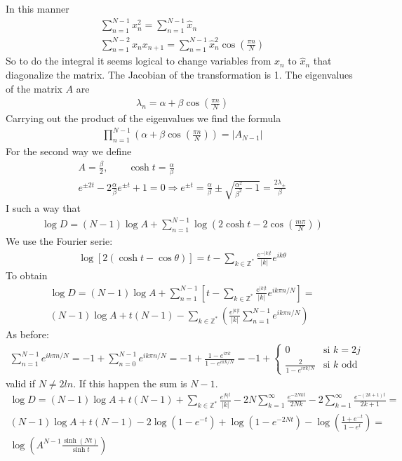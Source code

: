 \documentclass[12pt]{article}
\begin{document}
In this manner
\begin{gather}
\sum_{n=1}^{N-1}x_n^2=\sum_{n=1}^{N-1}\hat x_n \\
\sum_{n=1}^{N-2}x_n x_{n+1}=\sum_{n=1}^{N-1} \hat x_n^2 \cos\left(\frac{\pi n}{N}\right)
\end{gather}
So to do the integral it seems logical to change variables from $x_n$ to $\hat x_n$ that diagonalize the matrix. The Jacobian of the transformation is 1. The eigenvalues of the matrix $A$ are
\begin{gather}
\lambda_n=\alpha+\beta \cos\left(\frac{\pi n}{N}\right)
\end{gather}
Carrying out the product of the eigenvalues we find the formula
\begin{gather}
\prod_{n=1}^{N-1}\left(\alpha+\beta\cos\left(\frac{\pi n}{N}\right)\right)=|A_{N-1}|
\end{gather}
For the second way we define
\begin{gather}
A=\frac{\beta}{2},\qquad \cosh t=\frac{\alpha}{\beta} \\
e^{\pm 2t}-2\frac{\alpha}{\beta}e^{\pm t}+1=0\Rightarrow e^{\pm t}=\frac{\alpha}{\beta}\pm\sqrt{\frac{\alpha^2}{\beta^2}-1}=\frac{2\lambda_\pm}{\beta}
\end{gather}
I such a way that
\begin{gather}
\log D=(N-1)\log A+\sum_{n=1}^{N-1}\log\left(2\cosh t-2\cos\left(\frac{m \pi}{N}\right)\right)
\end{gather}
We use the Fourier serie:
\begin{gather}
\log\left[2(\cosh t-\cos \theta)\right]=t-\sum_{k\in\mathbb Z^*}\frac{e^{-|k|t}}{|k|}e^{ik\theta}
\end{gather}
To obtain
\begin{gather}
\log D=(N-1)\log A+\sum_{n=1}^{N-1}\left[t-\sum_{k\in\mathbb Z^*}\frac{e^{|k|t}}{|k|}e^{ik\pi n/N}\right]= \nonumber\\
(N-1)\log A+t(N-1)-\sum_{k\in\mathbb Z^*}\left(\frac{e^{|k|t}}{|k|}\sum_{n=1}^{N-1}e^{ik\pi n/N}\right)
\end{gather}
As before:
\begin{gather}
\sum_{n=1}^{N-1}e^{ik\pi n/N}=-1+\sum_{n=0}^{N-1}e^{ik\pi n/N}
=-1+\frac{1-e^{i\pi k}}{1-e^{i\pi k/N}}=-1+
\left\{\begin{matrix}
0 & \textrm{si } k=2j\\
\frac{2}{1-e^{i\pi k/N}} & \textrm{si $k$ odd}
\end{matrix}\right.
\end{gather}
valid if $N\neq 2ln$. If this happen the sum is $N-1$.
\begin{gather}
\log D=(N-1)\log A+t(N-1)+\sum_{k\in\mathbb Z^*}\frac{e^{|k|t}}{|k|}-2N\sum_{k=1}^\infty \frac{e^{-2Nkt}}{2Nk}-2\sum_{k=1}^\infty\frac{e^{-(2k+1)t}}{2k+1}=\nonumber \\
(N-1)\log A+t(N-1)-2\log(1-e^{-t})+\log(1-e^{-2Nt})-\log\left(\frac{1+e^{-t}}{1-e^{t}}\right)=\nonumber \\
\log\left(A^{N-1}\frac{\sinh(Nt)}{\sinh t}\right)
\end{gather}
\end{document}
